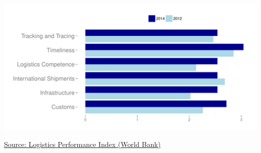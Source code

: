 \documentclass{article}\usepackage[]{graphicx}\usepackage[]{color}
\makeatletter
\def\maxwidth{ %
  \ifdim\Gin@nat@width>\linewidth
    \linewidth
  \else
    \Gin@nat@width
  \fi
}
\makeatother
\begin{document}
\begin{minipage}[t]{0.99\textwidth}
\begin{minipage}[c]{0.50\textwidth}
{\centering \includegraphics[width=\maxwidth]{figure/LPIindicators-1} 

}



  \raggedright\footnotesize{\href{http://lpi.worldbank.org}{Source: Logistics Performance Index (World Bank)}}
  \end{minipage}
\end{minipage}  
\end{document}
